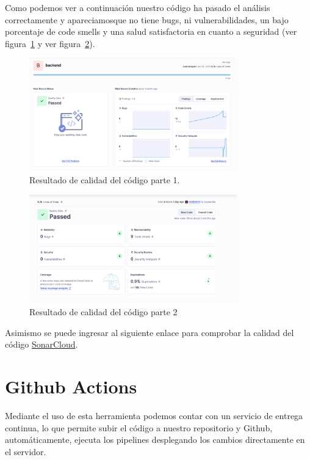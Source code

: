 Como podemos ver a continuación nuestro código ha pasado el análisis correctamente y apareciamosque no tiene bugs, ni vulnerabilidades, un bajo porcentaje de code smells y una salud satisfactoria en cuanto a seguridad (ver figura~\ref{Img:Calidad+del+codigo} y ver figura~\ref{Img:Calidad+del+codigo_2}).

\begin{figure}[h]
    \centering
    \includegraphics[width=0.8\textwidth]{img/manual/code_sonar_1.png}
    \caption{Resultado de calidad del código parte 1.} \label{Img:Calidad+del+codigo}
\end{figure} 

\begin{figure}[h]
    \centering
    \includegraphics[width=0.8\textwidth]{img/manual/code_sonar.png}
    \caption{Resultado de calidad del código parte 2} \label{Img:Calidad+del+codigo_2}
\end{figure} 

Asimismo se puede ingresar al siguiente enlace para comprobar la calidad del código \href{https://sonarcloud.io/project/overview?id=emur-uy_backend}{SonarCloud}.
\newpage

\section{Github Actions}
Mediante el uso de esta herramienta podemos contar con un servicio de entrega continua, lo que permite subir el código a nuestro repositorio y Github, automáticamente, ejecuta los pipelines desplegando los cambios directamente en el servidor.


